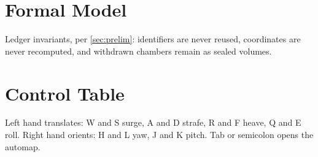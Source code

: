 \documentclass{article}
\begin{document}
\section{Formal Model}\label{app:formal}
Ledger invariants, per \ref{sec:prelim}: identifiers are never reused, coordinates are never recomputed, and withdrawn chambers remain as sealed volumes.
\section{Control Table}\label{app:controls}
Left hand translates: W and S surge, A and D strafe, R and F heave, Q and E roll. Right hand orients: H and L yaw, J and K pitch. Tab or semicolon opens the automap.
\end{document}
